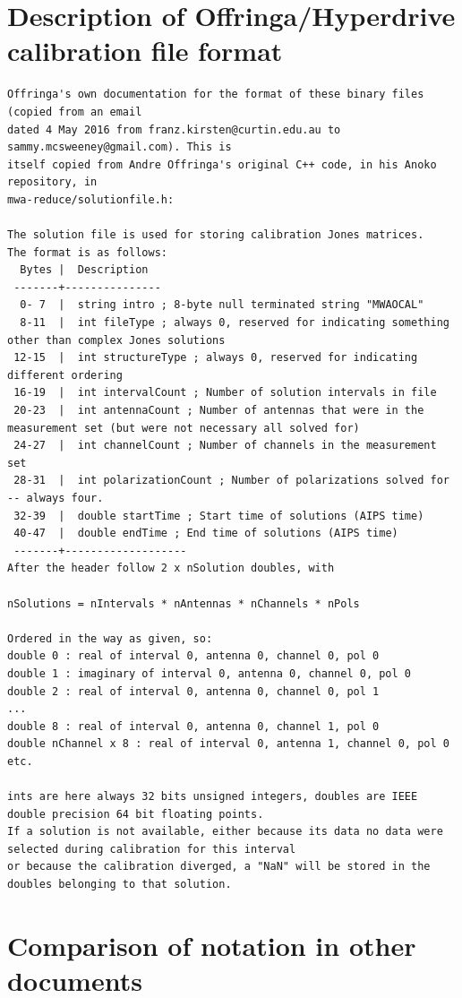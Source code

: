 \documentclass{book}
\begin{document}
\chapter{Description of Offringa/Hyperdrive calibration file format}
\label{app:offringa}

\begin{lstlisting}
Offringa's own documentation for the format of these binary files (copied from an email
dated 4 May 2016 from franz.kirsten@curtin.edu.au to sammy.mcsweeney@gmail.com). This is
itself copied from Andre Offringa's original C++ code, in his Anoko repository, in
mwa-reduce/solutionfile.h:

The solution file is used for storing calibration Jones matrices.
The format is as follows:
  Bytes |  Description
 -------+---------------
  0- 7  |  string intro ; 8-byte null terminated string "MWAOCAL"
  8-11  |  int fileType ; always 0, reserved for indicating something other than complex Jones solutions
 12-15  |  int structureType ; always 0, reserved for indicating different ordering
 16-19  |  int intervalCount ; Number of solution intervals in file
 20-23  |  int antennaCount ; Number of antennas that were in the measurement set (but were not necessary all solved for)
 24-27  |  int channelCount ; Number of channels in the measurement set
 28-31  |  int polarizationCount ; Number of polarizations solved for -- always four.
 32-39  |  double startTime ; Start time of solutions (AIPS time)
 40-47  |  double endTime ; End time of solutions (AIPS time)
 -------+-------------------
After the header follow 2 x nSolution doubles, with

nSolutions = nIntervals * nAntennas * nChannels * nPols

Ordered in the way as given, so:
double 0 : real of interval 0, antenna 0, channel 0, pol 0
double 1 : imaginary of interval 0, antenna 0, channel 0, pol 0
double 2 : real of interval 0, antenna 0, channel 0, pol 1
...
double 8 : real of interval 0, antenna 0, channel 1, pol 0
double nChannel x 8 : real of interval 0, antenna 1, channel 0, pol 0
etc.

ints are here always 32 bits unsigned integers, doubles are IEEE
double precision 64 bit floating points.
If a solution is not available, either because its data no data were
selected during calibration for this interval
or because the calibration diverged, a "NaN" will be stored in the
doubles belonging to that solution.
\end{lstlisting}

\chapter{Comparison of notation in other documents}
\end{document}
